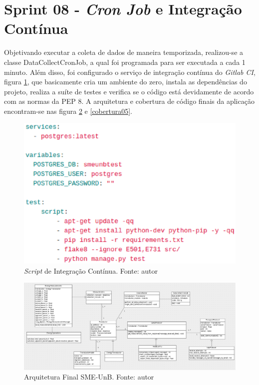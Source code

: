 \section{Sprint 08 - \textit{Cron Job} e Integração Contínua}
Objetivando executar a coleta de dados de maneira temporizada, realizou-se a classe DataCollectCronJob, a qual foi programada para ser executada a cada 1 minuto. Além disso, foi configurado o serviço de integração contínua do \textit{Gitlab CI}, figura \ref{gitlabci}, que basicamente cria um ambiente do zero, instala as dependências do projeto, realiza a suíte de testes e verifica se o código está devidamente de acordo com as normas da PEP 8. A arquitetura e cobertura de código finais da aplicação encontram-se nas figura \ref{sprint08arq} e \ref{cobertura05}.
\begin{figure}[!htpb]
    \centering
    \includegraphics[keepaspectratio=true,scale=0.6]{figuras/gitlabci.eps}
    \caption{\textit{Script} de Integração Contínua. Fonte: autor}
    \label{gitlabci}
\end{figure}

\begin{figure}[!htpb]
    \centering
    \includegraphics[scale=0.4,angle=90]{figuras/sprint08arq.eps}
    \caption{Arquitetura Final SME-UnB. Fonte: autor}
    \label{sprint08arq}
\end{figure}

